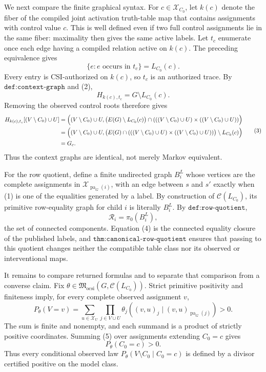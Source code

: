 We next compare the finite graphical syntax. For \(c\in\mathcal X_{C_0}\), let \(k(c)\) denote the fiber of the compiled joint activation truth-table map that contains assignments with control value \(c\). This is well defined even if two full control assignments lie in the same fiber: maximality then gives the same active labels. Let \(t_c\) enumerate once each edge having a compiled relation active on \(k(c)\). The preceding equivalence gives
\[
\{e:e\text{ occurs in }t_c\}=L_{C_0}(c).
\tag{2}
\]
Every entry is CSI-authorized on \(k(c)\), so \(t_c\) is an authorized trace. By \(\texttt{def:context-graph}\) and (2),
\[
H_{k(c),t_c}=G\setminus L_{C_0}(c).
\]
Removing the observed control roots therefore gives
\[
\begin{aligned}
H_{k(c),t_c}[(V\setminus C_0)\cup U]
&=\Bigl((V\setminus C_0)\cup U,
      \bigl(E(G)\setminus L_{C_0}(c)\bigr)
      \cap(((V\setminus C_0)\cup U)\times((V\setminus C_0)\cup U))\Bigr)\\
&=\Bigl((V\setminus C_0)\cup U,
      \bigl(E(G)\cap(((V\setminus C_0)\cup U)\times((V\setminus C_0)\cup U))\bigr)
      \setminus L_{C_0}(c)\Bigr)\\
&=G_c.
\end{aligned}
\tag{3}
\]
Thus the context graphs are identical, not merely Markov equivalent.

For the row quotient, define a finite undirected graph \(B_i^L\) whose vertices are the complete assignments in \(\mathcal X_{\operatorname{pa}_G(i)}\), with an edge between \(s\) and \(s'\) exactly when (1) is one of the equalities generated by a label. By construction of \(\mathcal C(L_{C_0})\), its primitive row-equality graph for child \(i\) is literally \(B_i^L\). By \(\texttt{def:row-quotient}\),
\[
\mathcal R_i=\pi_0(B_i^L),
\tag{4}
\]
the set of connected components. Equation (4) is the connected equality closure of the published labels, and \(\texttt{thm:canonical-row-quotient}\) ensures that passing to this quotient changes neither the compatible table class nor its observed or interventional maps.

It remains to compare returned formulas and to separate that comparison from a converse claim. Fix
\(
\theta\in\mathfrak M_{\mathrm{ocsi}}(G,\mathcal C(L_{C_0})).
\)
Strict primitive positivity and finiteness imply, for every complete observed assignment \(v\),
\[
P_\theta(V=v)
=\sum_{u\in\mathcal X_U}
  \prod_{j\in V\cup U}
  \theta_j\!\left((v,u)_j\mid(v,u)_{\operatorname{pa}_G(j)}\right)>0.
\tag{5}
\]
The sum is finite and nonempty, and each summand is a product of strictly positive coordinates. Summing (5) over assignments extending \(C_0=c\) gives
\[
P_\theta(C_0=c)>0.
\tag{6}
\]
Thus every conditional observed law \(P_\theta(V\setminus C_0\mid C_0=c)\) is defined by a divisor certified positive on the model class.

